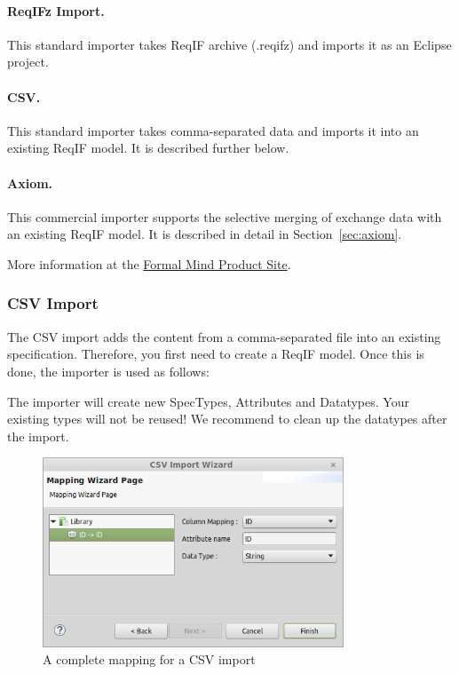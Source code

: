 \paragraph{ReqIFz Import.} This standard importer takes ReqIF archive (.reqifz) and imports it as an Eclipse project.

\paragraph{CSV.} This standard importer takes comma-separated data and imports it into an existing ReqIF model.  It is described further below.

\paragraph{Axiom.} This commercial importer supports the selective merging of exchange data with an existing ReqIF model.  It is described in detail in Section~\ref{sec:axiom}.

More information at the \href{http://formalmind.com/axiom}{Formal Mind Product Site}.

\subsubsection{CSV Import}

The CSV import adds the content from a comma-separated file into an existing specification.  Therefore, you first need to create a ReqIF model.  Once this is done, the importer is used as follows:

\begin{warning}
The importer will create new SpecTypes, Attributes and Datatypes.  Your existing types will not be reused!  We recommend to clean up the datatypes after the import.
\end{warning}

\begin{figure}
  \centering
  \includegraphics[width=0.8\textwidth]{../rmf-images/CSV_import.png}
  \caption{A complete mapping for a CSV import}
  \label{fig:reqif_search}
\end{figure}
\label{sec:reqif_search}

